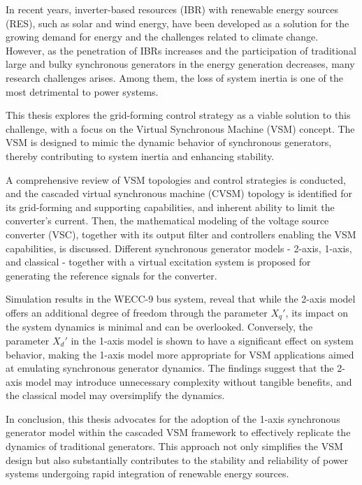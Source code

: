 \begin{eabstract}

In recent years, inverter-based resources (IBR) with renewable energy sources
(RES), such as solar and wind energy, have been developed as a solution for the
growing demand for energy and the challenges related to climate change. However,
as the penetration of IBRs increases and the participation of traditional large
and bulky synchronous generators in the energy generation decreases, many
research challenges arises. Among them, the loss of system inertia is one of the
most detrimental to power systems.

This thesis explores the grid-forming control strategy as a viable solution to
this challenge, with a focus on the Virtual Synchronous Machine (VSM) concept.
The VSM is designed to mimic the dynamic behavior of synchronous generators,
thereby contributing to system inertia and enhancing stability.

A comprehensive review of VSM topologies and control strategies is conducted,
and the cascaded virtual synchronous machine (CVSM) topology is identified for
its grid-forming and supporting capabilities, and inherent ability to limit the
converter's current. Then, the mathematical modeling of the voltage source
converter (VSC), together with its output filter and controllers enabling the 
VSM capabilities, is discussed. Different synchronous generator models - 2-axis,
1-axis, and classical - together with a virtual excitation system is proposed for 
generating the reference signals for the converter.

Simulation results in the WECC-9 bus system, reveal that while the 2-axis model
offers an additional degree of freedom through the parameter $X_q'$, its impact
on the system dynamics is minimal and can be overlooked. Conversely, the
parameter $X_d'$ in the 1-axis model is shown to have a significant effect on
system behavior, making the 1-axis model more appropriate for VSM applications
aimed at emulating synchronous generator dynamics. The findings suggest that the
2-axis model may introduce unnecessary complexity without tangible benefits, and
the classical model may oversimplify the dynamics.

In conclusion, this thesis advocates for the adoption of the 1-axis synchronous
generator model within the cascaded VSM framework to effectively replicate the
dynamics of traditional generators. This approach not only simplifies the VSM
design but also substantially contributes to the stability and reliability of
power systems undergoing rapid integration of renewable energy sources.

\end{eabstract}